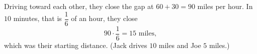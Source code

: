 Driving toward each other, they close the gap at $60+30=90$ miles per hour. In $10$ minutes, that is $\dfrac{1}{6}$ of an hour, they close
\[90\cdot\dfrac{1}{6}=\boxed{15\text{ miles}},\]
which was their starting distance. (Jack drives $10$ miles and Joe $5$ miles.)
